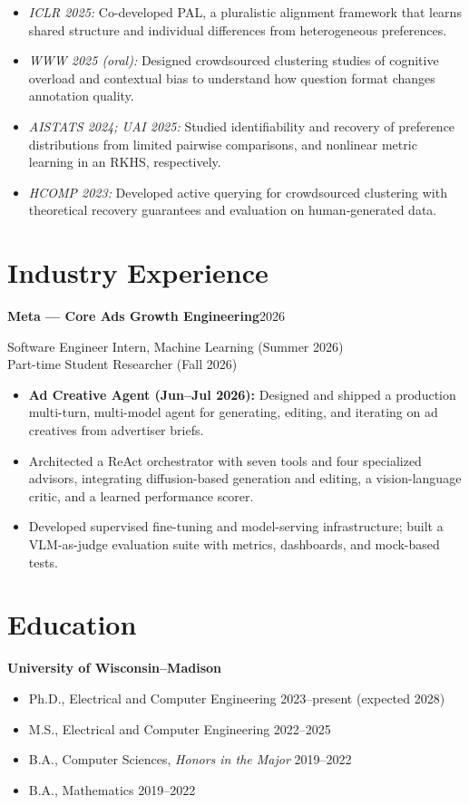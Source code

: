 \documentclass[11pt,letterpaper]{article}
\newcommand{\entry}[2]{\Needspace{4\baselineskip}\textbf{#1}\hfill #2\par}
\begin{document}
\begin{itemize}
\item \textit{ICLR 2025:} Co-developed PAL, a pluralistic alignment framework that learns shared structure and individual differences from heterogeneous preferences.
\item \textit{WWW 2025 (oral):} Designed crowdsourced clustering studies of cognitive overload and contextual bias to understand how question format changes annotation quality.
\item \textit{AISTATS 2024; UAI 2025:} Studied identifiability and recovery of preference distributions from limited pairwise comparisons, and nonlinear metric learning in an RKHS, respectively.
\item \textit{HCOMP 2023:} Developed active querying for crowdsourced clustering with theoretical recovery guarantees and evaluation on human-generated data.
\end{itemize}

\section*{Industry Experience}
\entry{Meta --- Core Ads Growth Engineering}{2026}
Software Engineer Intern, Machine Learning (Summer 2026)\\
Part-time Student Researcher (Fall 2026)
\begin{itemize}
\item \textbf{Ad Creative Agent (Jun--Jul 2026):} Designed and shipped a production multi-turn, multi-model agent for generating, editing, and iterating on ad creatives from advertiser briefs.
\item Architected a ReAct orchestrator with seven tools and four specialized advisors, integrating diffusion-based generation and editing, a vision-language critic, and a learned performance scorer.
\item Developed supervised fine-tuning and model-serving infrastructure; built a VLM-as-judge evaluation suite with metrics, dashboards, and mock-based tests.
\end{itemize}

\section*{Education}
\textbf{University of Wisconsin--Madison}
\begin{itemize}[label={},leftmargin=0pt,itemsep=2pt]
\item Ph.D., Electrical and Computer Engineering \hfill 2023--present (expected 2028)
\item M.S., Electrical and Computer Engineering \hfill 2022--2025
\item B.A., Computer Sciences, \textit{Honors in the Major} \hfill 2019--2022
\item B.A., Mathematics \hfill 2019--2022
\end{itemize}
\end{document}
